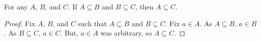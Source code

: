 \guard



\begin{prop}
\label{prop:subsetRelationsIsTransitive}
  For any $A$, $B$, and $C$.
  If $A\subseteq B$ and $B\subseteq C$, then $A\subseteq C$.
\end{prop}
\begin{proof}
  Fix $A$, $B$, and $C$ such that $A\subseteq B$ and $B\subseteq C$.
  Fix $a\in A$.
  As $A\subseteq B$, $a\in B$.
  As $B\subseteq C$, $a\in C$.
  But, $a\in A$ was arbitrary, so $A\subseteq C$.
\end{proof}
